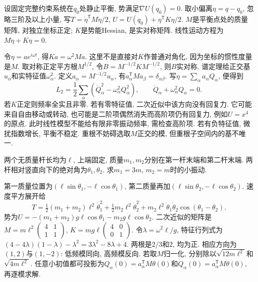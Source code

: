 设固定完整约束系统在$q_0$处静止平衡, 势满足$\nabla U(q_0)=0$. 取小偏离$\eta=q-q_0$, 忽略三阶及以上小量, 写$T=\dot\eta^{\mathsf T}M\dot\eta/2$, $U=U(q_0)+\eta^{\mathsf T}K\eta/2$. $M$是平衡点处的质量矩阵, 对独立坐标正定; $K$是势能Hessian, 是实对称矩阵. 线性运动方程为$M\ddot\eta+K\eta=0$.

令$\eta=a e^{i\omega t}$, 得$Ka=\omega^2Ma$. 这里不是直接对$K$作普通对角化, 因为坐标的惯性度量是$M$. 取对称正定平方根$M^{1/2}$, 令$B=M^{-1/2}KM^{-1/2}$, 则$B$实对称. 谱定理给正交基$u_\alpha$和实特征值$\omega_\alpha^2$. 定义$a_\alpha=M^{-1/2}u_\alpha$, 有$a_\alpha^{\mathsf T}Ma_\beta=\delta_{\alpha\beta}$. 写$\eta=\sum_\alpha a_\alpha Q_\alpha$, 便得到
\[
L_2=\frac12\sum_\alpha(\dot Q_\alpha^2-\omega_\alpha^2Q_\alpha^2),\qquad
\ddot Q_\alpha+\omega_\alpha^2Q_\alpha=0.
\]
若$K$正定则频率全实且非零. 若有零特征值, 二次近似中该方向没有回复力. 它可能来自自由移动或转动, 也可能是二阶项偶然消失而高阶项仍有回复力, 例如$U=x^4$的原点. 此时线性模型不能给有限非零振动频率, 需检查高阶项. 若有负特征值, 微扰指数增长, 平衡不稳定. 重根不妨碍选取$M$正交的模, 但重根子空间内的基不唯一.

\begin{example}
两个无质量杆长均为$\ell$, 上端固定, 质量$m_1,m_2$分别在第一杆末端和第二杆末端. 两杆相对竖直向下的绝对角为$\theta_1,\theta_2$. 求$m_1=3m$, $m_2=m$时的小振动.
\end{example}
\begin{solution}
第一质量位置为$(\ell\sin\theta_1,-\ell\cos\theta_1)$, 第二质量再加$(\ell\sin\theta_2,-\ell\cos\theta_2)$. 速度平方展开给
\[
T=\tfrac12(m_1+m_2)\ell^2\dot\theta_1^2+\tfrac12m_2\ell^2\dot\theta_2^2
+m_2\ell^2\dot\theta_1\dot\theta_2\cos(\theta_1-\theta_2).
\]
势为$U=-(m_1+m_2)g\ell\cos\theta_1-m_2g\ell\cos\theta_2$. 二次近似的矩阵是$M=m\ell^2\left(\begin{smallmatrix}4&1\\1&1\end{smallmatrix}\right)$, $K=mg\ell\left(\begin{smallmatrix}4&0\\0&1\end{smallmatrix}\right)$. 令$\lambda=\omega^2\ell/g$, 特征行列式为$(4-4\lambda)(1-\lambda)-\lambda^2=3\lambda^2-8\lambda+4$. 两根是$2/3$和$2$, 均为正. 相应方向为$(1,2)$与$(1,-2)$: 低频模同向, 高频模反向. 若取$M$归一化, 分别除以$\sqrt{12m\ell^2}$和$\sqrt{4m\ell^2}$. 任意小初值都可投影为$Q_\alpha(0)=a_\alpha^{\mathsf T}M\theta(0)$和$\dot Q_\alpha(0)=a_\alpha^{\mathsf T}M\dot\theta(0)$, 再逐模求解.
\end{solution}

